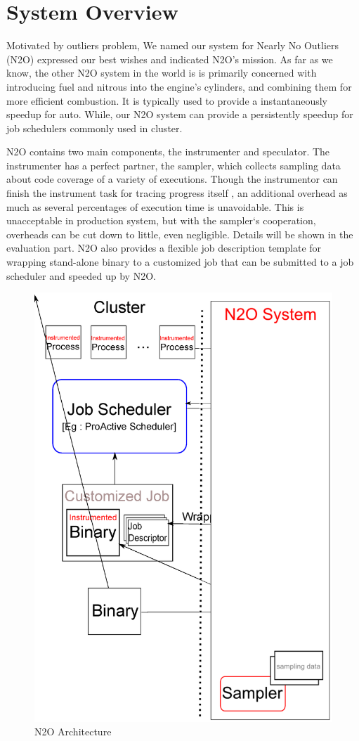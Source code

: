 \section{System Overview}

Motivated by outliers problem, We named our system for Nearly No Outliers (N2O) expressed our best wishes and indicated N2O’s mission. As far as we know, the other N2O system in the world is is primarily concerned with introducing fuel and nitrous into the engine's cylinders, and combining them for more efficient combustion. It is typically used to provide a instantaneously speedup for auto. While, our N2O system can provide a persistently speedup for job schedulers commonly used in cluster.

N2O contains two main components, the instrumenter and speculator. The instrumenter has a perfect partner, the sampler, which collects sampling data about code coverage of a variety of executions. Though the instrumentor can finish the instrument task for tracing progress itself , an additional overhead as much as several percentages of execution time is unavoidable. This is unacceptable in production system, but with the sampler‘s cooperation, overheads can be cut down to little, even negligible. Details will be shown in the evaluation part. N2O also provides a flexible job description template for wrapping stand-alone binary to a customized job that can be submitted to a job scheduler and speeded up by N2O. 

\begin{figure}
\centering
\includegraphics[width=0.9\columnwidth]{figures/N2O_arch.eps}
\caption{N2O Architecture}
\label{figure:n2oarch}
\end{figure}

